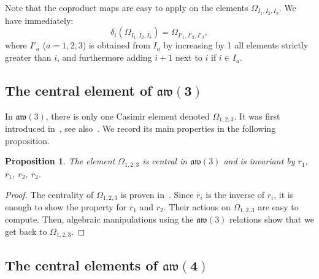\documentclass[10pt,a4paper]{amsart}
\numberwithin{equation}{section}
\newtheorem{prop}[theo]{Proposition}
\theoremstyle{definition}
\newcommand{\rb}{\overline{r}}
\begin{document}
Note that the coproduct maps are easy to apply on the elements $\varOmega_{I_1,I_2,I_3}$. We have immediately:
\begin{equation}\label{eq:deltaOmega}
\delta_i(\varOmega_{I_1,I_2,I_3})=\varOmega_{I'_1,I'_2,I'_3} ,
\end{equation}
where $I'_a$ ($a=1,2,3$) is obtained from $I_a$ by increasing by 1 all elements strictly greater than $i$, and furthermore adding $i+1$ next to $i$ if $i\in I_a$.

\subsection[The central element of aw(3)]{The central element of $\boldsymbol{\mathfrak{aw}(3)}$}

In $\mathfrak{aw}(3)$, there is only one Casimir element denoted $\varOmega_{1,2,3}$.
It was first introduced in~\cite{Zh2}, see also~\cite{avatar, Zh}. We record its main properties in the following proposition.

\begin{prop}\label{propcas3}
The element $\varOmega_{1,2,3}$ is central in $\mathfrak{aw}(3)$ and is invariant by $r_1$, $\rb_1$, $r_2$, $\rb_2$.
\end{prop}
\begin{proof}
The centrality of $\varOmega_{1,2,3}$ is proven in~\cite{Zh2}. Since $\rb_i$ is the inverse of $r_i$, it is enough to show the property for $\rb_1$ and $r_2$.
Their actions on $\varOmega_{1,2,3}$ are easy to compute. Then, algebraic manipulations using the $\mathfrak{aw}(3)$ relations show that we get back to $\varOmega_{1,2,3}$.
\end{proof}


\subsection[The central elements of aw(4)]{The central elements of $\boldsymbol{\mathfrak{aw}(4)}$}
\end{document}
